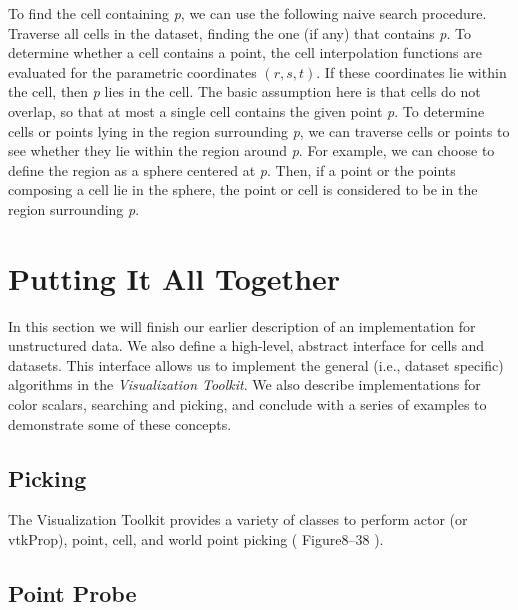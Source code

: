 To find the cell containing \emph{p}, we can use the following naive search procedure.
Traverse all cells in the dataset, finding the one (if any) that contains \emph{p}.
To determine whether a cell contains a point, the cell interpolation functions are evaluated for the parametric coordinates $(r,s,t)$.
If these coordinates lie within the cell, then \emph{p} lies in the cell.
The basic assumption here is that cells do not overlap, so that at most a single cell contains the given point \emph{p}.
To determine cells or points lying in the region surrounding \emph{p}, we can traverse cells or points to see whether they lie within the region around \emph{p}.
For example, we can choose to define the region as a sphere centered at \emph{p}.
Then, if a point or the points composing a cell lie in the sphere, the point or cell is considered to be in the region surrounding \emph{p}.

\section{Putting It All Together}
In this section we will finish our earlier description of an implementation for unstructured data. We also define a high-level, abstract interface for cells and datasets. This interface allows us to implement the general (i.e., dataset specific) algorithms in the \emph{Visualization Toolkit}. We also describe
implementations for color scalars, searching and picking, and conclude with a series of examples to demonstrate some of these concepts.

\subsection{Picking}
\label{subsec:picking}

The Visualization Toolkit provides a variety of classes to perform actor (or vtkProp), point, cell, and
world point picking ( Figure8–38 ).

\subsection{Point Probe}
\label{subsec:point_probe}